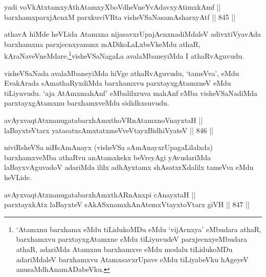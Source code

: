 

\begin{shl}
yadi voVkAtxtamxyAthAtamxyXboVdheVneYvAdavxyAtimxkAmf || \\
barxhamxparxjAcnxM parxkuviVRta visheVSaNasamAsharxyAtf \hfill || 845 ||  
\end{shl}

\begin{artha}
athavA hiMde heVLida Atamxna nijasavxrUpajAcnxnadiMdaleV adivxtiVyavAda barxhamxna parxjecnxyanunx mADikoLaLxbeVkeMdu athaR, kAraNa\-\break veVneMdare,\footnote{`Atamxnu barxhamx eMdu tiLidukoMDu eMdu `vijAcnxya' eMbudara athaR, barxhamxvu parxtayxgAtamxne eMdu tiLiyuvudeV parxjecnxyeMbudara athaR, adariMda Atamxnu barxhamxve eMdu modalu tiLidukoMDu adariMdaleV barxhamxvu AtamxsavxrUpave eMdu tiLiyabeVku hAgeyeV anusaMdhAnamADabeVku.}visheVSaNagaLa avalaMbaneyiMda I athaRvAguvudu.
\end{artha}

\begin{artha}
visheVSaNada avalaMbaneyiMda hiVge athaRvAguvudu, `tameVva', eMdu EvakArada sAmathaRyxdiMda barxhamxvu parxtayxgAtamxneV eMdu tiLiyuvudu. `aja AtAmxmahAnf' eMbalilxruva mahAnf eMba visheVSaNadiMda parxtayxgAtamxnu barxhamxveMdu sididhxsuvudu.
\end{artha}


\begin{shl}
avAyxvaqtAtxnanugatabarxhAmxthoVR\s nAtamxnoV\s nayxtaH || \\
laBayxteV\s tarx yatasatxsAmxtatxmeVveVtayxBidhiVyateV \hfill || 846 ||  
\end{shl}

\begin{artha}
niviRsheVSa niHsAmAnayx (visheVSa sAmAnayxrUpagaLilalxda) barxhamxveMba athaRvu anAtamxkekx beVreyAgi yAvudariMda laBayxvAguvadoV adariMda ililx adhAyxtamx shAsatxrXdalilx tameVva eMdu heVLide.
\end{artha}


\begin{shl}
avAyxvaqtAtxnanugatabarxhAmxthARnAnxpi cAnayxtaH || \\
parxtayxkAtx laBayxteV sAkASxnamxhAnAtemxVtayxtoV\s tarx giVH \hfill || 847 ||  
\end{shl}

